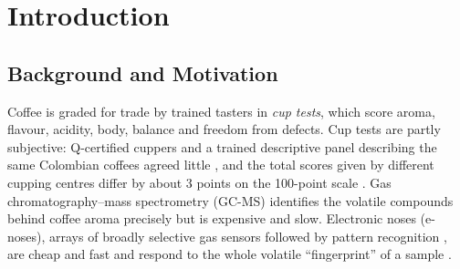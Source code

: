\documentclass[12pt]{article}
\begin{document}
\newpage
\thispagestyle{empty}
\clearpage             %
\thispagestyle{empty}  %
\phantom{a}            %
\newpage

\setlength{\floatsep}{8pt plus 2pt minus 2pt}
\setlength{\textfloatsep}{10pt plus 2pt minus 4pt}
\setlength{\intextsep}{8pt plus 2pt minus 2pt}
\setlength{\abovecaptionskip}{4pt}
\setlength{\belowcaptionskip}{4pt}
\setlength{\bibsep}{2pt plus 1pt}
\renewcommand{\topfraction}{0.9}
\renewcommand{\bottomfraction}{0.8}
\renewcommand{\textfraction}{0.07}
\renewcommand{\floatpagefraction}{0.75}
\setcounter{topnumber}{3}
\setcounter{bottomnumber}{2}
\setcounter{totalnumber}{5}

\section{Introduction}

\subsection{Background and Motivation}

Coffee is graded for trade by trained tasters in \emph{cup tests}, which score aroma, flavour, acidity, body, balance and freedom from defects. Cup tests are partly subjective: Q-certified cuppers and a trained descriptive panel describing the same Colombian coffees agreed little \cite{didonfrancesco2014comparison}, and the total scores given by different cupping centres differ by about 3 points on the 100-point scale \cite{worku2016reproducibility}. Gas chromatography--mass spectrometry (GC-MS) identifies the volatile compounds behind coffee aroma precisely \cite{huang2007fingerprint} but is expensive and slow. Electronic noses (e-noses), arrays of broadly selective gas sensors followed by pattern recognition \cite{persaud1982analysis,gardner1999electronic}, are cheap and fast and respond to the whole volatile ``fingerprint'' of a sample \cite{wilson2009applications}.
\end{document}
